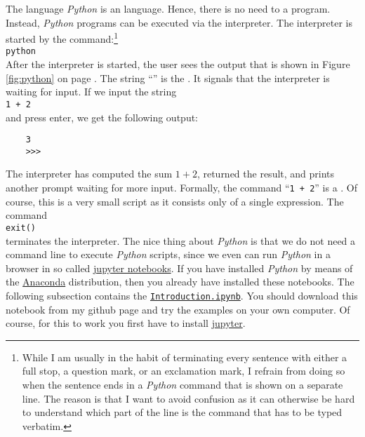 The language \textsl{Python} is an  language.  Hence, there is no need to  a
program.  Instead, \textsl{Python} programs can be executed via the interpreter.  The interpreter is started
by the command:\footnote{
  While I am usually in the habit of terminating every sentence with either a full stop, a question
  mark, or an exclamation mark, I refrain from doing so when the sentence ends in a \textsl{Python} command
  that is shown on a separate line.  The reason is that I want to avoid confusion as it can
  otherwise be hard to understand which part of the line is the command that has to be typed
  verbatim.
}
\\[0.2cm]
\hspace*{1.3cm}
\texttt{python}
\\[0.2cm]
After the interpreter is started, the user sees the output that is shown in Figure 
\ref{fig:python} on page \pageref{fig:python}.  The string
``\texttt{}'' is the .  It signals that the interpreter is waiting for input.
If we input the string
\\[0.2cm]
\hspace*{1.3cm}
\texttt{1 + 2}
\\[0.2cm]
and press enter, we get the following output:
\begin{verbatim}
    3
    >>> 
\end{verbatim}
The interpreter has computed the sum $1+2$, returned the result, and prints another prompt waiting
for more input.  Formally, the command ``\texttt{1 + 2}''
is a .  Of course, this is a very small script as it consists only of a single expression.
The command
\\[0.2cm]
\hspace*{1.3cm}
\texttt{exit()}
\\[0.2cm]
terminates the interpreter.   The nice thing about \textsl{Python}  is that we do not need a command line to
execute \textsl{Python} scripts, since we even  can run \textsl{Python} in a
browser in so called \href{https://en.wikipedia.org/wiki/Project_Jupyter}{jupyter notebooks}.  If you have
installed \textsl{Python} by means of the \href{https://www.anaconda.com/download/}{Anaconda} distribution,
then you already have installed these notebooks.  The following subsection contains the  
\href{https://github.com/karlstroetmann/Logic/blob/master/Python/Introduction.ipynb}{\texttt{Introduction.ipynb}}.
You should download this notebook from my github page and try the examples on your own computer.  Of course,
for this to work you first have to install \href{https://jupyter.org}{jupyter}.

